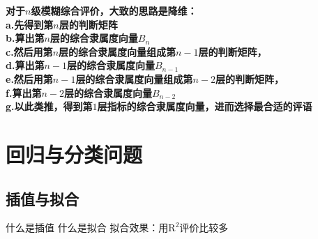 \documentclass[11pt,a4paper]{article}
\begin{document}
\noindent \textbf{对于$n$级模糊综合评价，大致的思路是降维：\\
a.先得到第$n$层的判断矩阵\\
b.算出第$n$层的综合隶属度向量$B_n$\\
c.然后用第$n$层的综合隶属度向量组成第$n-1$层的判断矩阵，\\
d.算出第$n-1$层的综合隶属度向量$B_{n-1}$\\
e.然后用第$n-1$层的综合隶属度向量组成第$n-2$层的判断矩阵，\\
f.算出第$n-2$层的综合隶属度向量$B_{n-2}$\\
g.以此类推，得到第$1$层指标的综合隶属度向量，进而选择最合适的评语\\}
\newpage




\section{回归与分类问题}
\subsection{插值与拟合}
什么是插值
什么是拟合
拟合效果：用$\mathrm{R}^2$评价比较多
\end{document}
